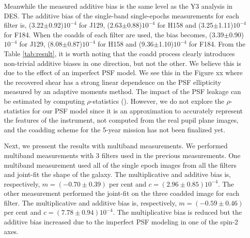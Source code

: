 \documentclass[fleqn,usenatbib]{mnras}
\begin{document}
Meanwhile the measured additive bias is the same level as the Y3 analysis in DES. The additive bias of the single-band single-epochs measurements for each filter is, (3.22$\pm$0.92)$10^{-4}$ for J129, (2.63$\pm$0.88)$10^{-4}$ for H158 and (3.25$\pm$1.11)$10^{-4}$ for F184. When the coadds of each filter are used, the bias becomes, (3.39$\pm$0.90)$10^{-4}$ for J129, (8.08$\pm$0.87)$10^{-4}$ for H158 and (9.36$\pm$1.10)$10^{-4}$ for F184. From the Table \ref{tab:result}, it is worth noting that the coadd process clearly introduces non-trivial additive biases in one direction, but not the other. We believe this is due to the effect of an imperfect PSF model. We see this in the Figure xx where the recovered shear has a strong linear dependence on the PSF ellipticity measured by an adaptive moments method. The impact of the PSF leakage can be estimated by computing $\rho$-statistics (\citealt{2008A&A...484...67P, 2010MNRAS.404..350R, 2016MNRAS.460.2245J}). However, we do not explore the $\rho$-statistics for our PSF model since it is an approximation to accurately represent the features of the instrument, not computed from the real pupil plane images, and the coadding scheme for the 5-year mission has not been finalized yet. 


Next, we pressent the results with multiband measurements. We performed multiband measurements with 3 filters used in the previous measurements. One multiband measurement used all of the single epoch images from all the filters and joint-fit the shape of the galaxy. The multiplicative and additive bias is, respectively, $m=(-0.70\pm0.39)$ per cent and $c=(2.96\pm0.85)10^{-4}$. The other measurement performed the joint-fit on the three coadded image for each filter. The multiplicative and additive bias is, respectively, $m=(-0.59\pm0.46)$ per cent and $c=(7.78\pm0.94)10^{-4}$. The multiplicative bias is reduced but the additive bias increased due to the imperfect PSF modeling in one of the spin-2 axes. 
\end{document}
